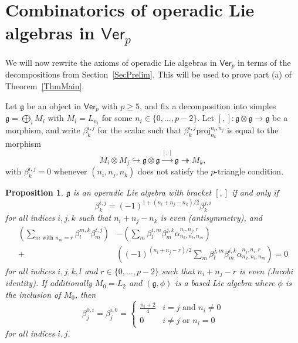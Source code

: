 \documentclass[11pt,a4paper,reqno]{amsart}
\newtheorem{prop}[theorem]{Proposition}
\theoremstyle{definition}
\numberwithin{equation}{section}
\newcommand{\Ver}{\mathsf{Ver}}
\newcommand{\fg}{\mathfrak{g}}
\newcommand{\proj}{\mathrm{proj}}
\begin{document}
\section{Combinatorics of operadic Lie algebras in $\Ver_p$}\label{SecLieForm}

We will now rewrite the axioms of operadic Lie algebras in $\Ver_p$ in terms of the decompositions from Section~\ref{SecPrelim}. This will be used to prove part (a) of Theorem~\ref{ThmMain}.

Let $\fg$ be an object in $\Ver_p$ with $p\geq5$, and fix a decomposition into simples $\fg=\bigoplus_i M_i$ with $M_i=L_{n_i}$ for some $n_i\in\{0,\dots,p-2\}$. Let $[,]:\fg\otimes\fg\to\fg$ be a morphism, and write $\beta^{i,j}_k$ for the scalar such that $\beta^{i,j}_k\proj_{n_k}^{n_i,n_j}$ is equal to the morphism
\[M_i\otimes M_j\hookrightarrow\fg\otimes\fg\xrightarrow{[,]}\fg\twoheadrightarrow M_k,\]
with $\beta^{i,j}_k=0$ whenever $(n_i,n_j,n_k)$ does not satisfy the $p$-triangle condition.

\begin{prop}\label{PropLieForm}
$\fg$ is an operadic Lie algebra with bracket $[,]$ if and only if
\begin{equation}\label{EqnAntisym}
\beta^{i,j}_k=(-1)^{1+(n_i+n_j-n_k)/2}\beta^{j,i}_k
\end{equation}
for all indices $i,j,k$ such that $n_i+n_j-n_k$ is even (antisymmetry), and
\begin{equation}\label{EqnJacobi}
\begin{split}
\left(\sum_{m\text{ with }n_m=r}\beta^{m,k}_l\beta^{i,j}_m\right)&-\left(\sum_m\beta^{i,m}_l\beta^{j,k}_m\alpha^{n_i,n_j,r}_{n_k,n_l,n_m}\right)\\
+&\left((-1)^{(n_i+n_j-r)/2}\sum_m\beta^{j,m}_l\beta^{i,k}_m\alpha^{n_j,n_i,r}_{n_k,n_l,n_m}\right)=0
\end{split}
\end{equation}
for all indices $i,j,k,l$ and $r\in\{0,\dots,p-2\}$ such that $n_i+n_j-r$ is even (Jacobi identity). If additionally $M_0=L_2$ and $(\fg,\phi)$ is a based Lie algebra where $\phi$ is the inclusion of $M_0$, then
\[\beta^{0,i}_j=\beta^{i,0}_j=\begin{cases}\frac{n_i+2}4&i=j\text{ and }n_i\neq0\\0&i\neq j\text{ or }n_i=0\end{cases}\]
for all indices $i,j$. 
\end{prop}
\end{document}
